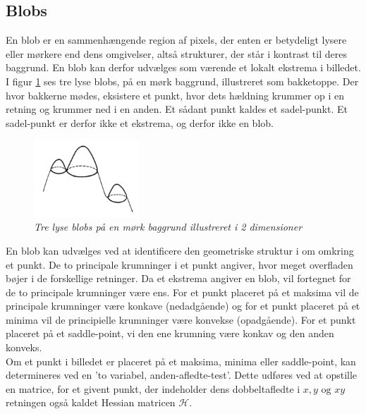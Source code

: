 \subsection*{Blobs}\label{sec:blobs}
En blob er en sammenhængende region af pixels, der enten er betydeligt lysere eller mørkere end dens omgivelser, altså strukturer, der står i kontrast til deres baggrund. En blob kan derfor udvælges som værende et lokalt ekstrema i billedet.
I figur \ref{fig:lindblob} ses tre lyse blobs, på en mørk baggrund, illustreret som bakketoppe. Der hvor bakkerne mødes, eksistere et punkt, hvor dets hældning krummer op i en retning og krummer ned i en anden. Et sådant punkt kaldes et sadel-punkt. Et sadel-punkt er derfor ikke et ekstrema, og derfor ikke en blob.
\begin{figure}[H]
    \centering
    \includegraphics[width=0.35\textwidth]{fig/44.png}
    \vspace{-0.5em}   
    \begin{center}
    \caption{{\footnotesize \textit{
    Tre lyse blobs på en mørk baggrund illustreret i 2 dimensioner \cite{blob}}}}
    \label{fig:lindblob}
     \end{center}
  \end{figure}
       \vspace{-2.7em}
\noindent
En blob kan udvælges ved at identificere den geometriske struktur i om omkring et punkt. De to principale krumninger i et punkt angiver, hvor meget overfladen bøjer i de forskellige retninger. Da et ekstrema angiver en blob, vil fortegnet for de to principale krumninger være ens. For et punkt placeret på et maksima vil de principale krumninger være konkave (nedadgående) og for et punkt placeret på et minima vil de principielle krumninger være konvekse (opadgående). For et punkt placeret på et saddle-point, vi den ene krumning være konkav og den anden konveks. \\ 
Om et punkt i billedet er placeret på et maksima, minima eller saddle-point, kan determineres ved en 'to variabel, anden-afledte-test'. Dette udføres ved at opstille en matrice, for et givent punkt, der indeholder dens dobbeltafledte i $x, y \text{ og } xy$ retningen også kaldet Hessian matricen $\mathcal{H}$.
